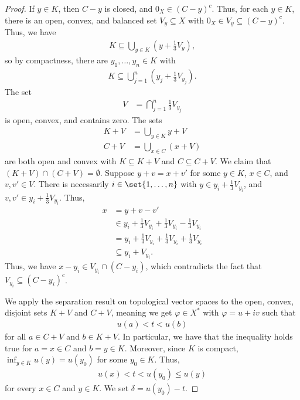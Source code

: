 \documentclass[10pt]{mypackage}
\begin{document}
\begin{proof}
  If $y\in K$, then $C-y$ is closed, and $0_X\in \left(C-y\right)^{c}$. Thus, for each $y\in K$, there is an open, convex, and balanced set $V_y\subseteq X$ with $0_X\in V_y\subseteq \left(C-y\right)^{c}$. Thus, we have
  \begin{align*}
    K\subseteq \bigcup_{y\in K}\left(y + \frac{1}{3}V_y\right),
  \end{align*}
  so by compactness, there are $y_1,\dots,y_n\in K$ with
  \begin{align*}
    K\subseteq \bigcup_{j=1}^{n}\left(y_j + \frac{1}{3}V_{y_j}\right).
  \end{align*}
  The set
  \begin{align*}
    V &= \bigcap_{j=1}^{n}\frac{1}{3}V_{y_j}
  \end{align*}
  is open, convex, and contains zero. The sets
  \begin{align*}
    K+V &= \bigcup_{y\in K}y+V\\
    C+V &= \bigcup_{x\in C}\left(x+V\right)
  \end{align*}
  are both open and convex with $K\subseteq K+V$ and $C\subseteq C+V$. We claim that $\left(K+V\right)\cap \left(C+V\right) = \emptyset$. Suppose $y+v = x + v'$ for some $y\in K$, $x\in C$, and $v,v'\in V$. There is necessarily $i\in \set{1,\dots,n}$ with $y\in y_i + \frac{1}{3}V_{y_i}$, and $v,v'\in y_i + \frac{1}{3}V_{y_i}$. Thus,
  \begin{align*}
    x &= y + v - v'\\
      &\in y_i + \frac{1}{3}V_{y_i} + \frac{1}{3}V_{y_i} - \frac{1}{3}V_{y_i}\\
      &= y_i + \frac{1}{3}V_{y_i} + \frac{1}{3}V_{y_i} + \frac{1}{3}V_{y_i}\\
      &\subseteq y_i + V_{y_i}.
  \end{align*}
  Thus, we have $x-y_i\in V_{y_i}\cap \left(C - y_i\right)$, which contradicts the fact that $V_{y_i}\subseteq \left(C - y_i\right)^{c}$.\newline

  We apply the separation result on topological vector spaces to the open, convex, disjoint sets $K+V$ and $C+V$, meaning we get $\varphi\in X^{\ast}$ with $\varphi = u + iv$ such that
  \begin{align*}
    u(a) < t < u(b)
  \end{align*}
  for all $a\in C+V$ and $b\in K+V$. In particular, we have that the inequality holds true for $a=x\in C$ and $b=y\in K$. Moreover, since $K$ is compact, $\inf_{y\in K}u(y) = u\left(y_0\right)$ for some $y_0\in K$. Thus,
  \begin{align*}
    u\left(x\right) < t < u\left(y_0\right)\leq u\left(y\right)
  \end{align*}
  for every $x\in C$ and $y\in K$. We set $\delta = u\left(y_0\right) - t$.
\end{proof}
\end{document}
